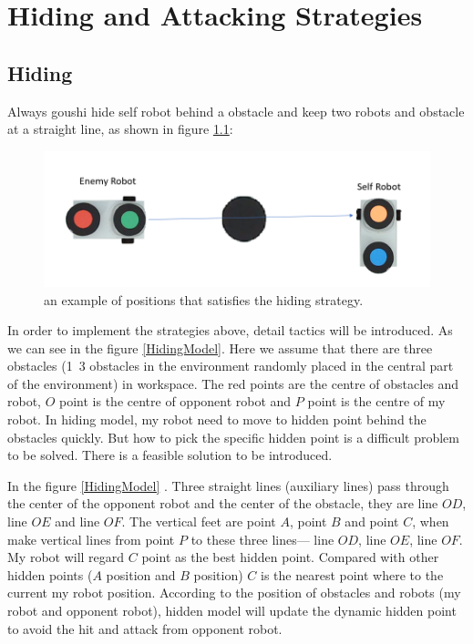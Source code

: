 \chapter{Hiding and Attacking Strategies}
\label{cha:STRATEGIES}

\section{Hiding}
Always  goushi hide self robot behind a obstacle and keep two robots and obstacle at a straight line, as shown in figure \ref{hiding_strategy}:

\begin{figure}[thb]
    \centering
    \includegraphics[width=1\textwidth]{images/hiding_strategy.png}
    \caption[hiding strategy]{an example of positions that satisfies the hiding strategy.}\label{hiding_strategy}
\end{figure}

 
In order to implement the strategies above, detail tactics will be introduced. As we can see in the figure  \ref{HidingModel}. Here we assume that there are three obstacles (1~3 obstacles in the environment randomly placed in the central part of the environment) in workspace. The red points are the centre of obstacles and robot,  $O$ point is the centre of opponent robot and $P$ point is the centre of my robot. In hiding model, my robot need to move to hidden point behind the obstacles quickly. But how to pick the specific hidden point is a difficult problem to be solved. There is a feasible solution to be introduced.

In the figure  \ref{HidingModel} . Three straight lines (auxiliary lines) pass through the center of the opponent robot and the center of the obstacle, they are line $OD$, line $OE$ and line $OF$. The vertical feet are point $A$, point $B$ and point $C$, when make vertical lines from point $P$ to these three lines— line $OD$, line $OE$, line $OF$. My robot will regard $C$ point as the best hidden point. Compared with other hidden points ($A$ position and $B$ position) $C$ is the nearest point where to the current my robot position. According to the position of obstacles and robots (my robot and opponent robot), hidden model will update the dynamic hidden point to avoid the hit and attack from opponent robot.

